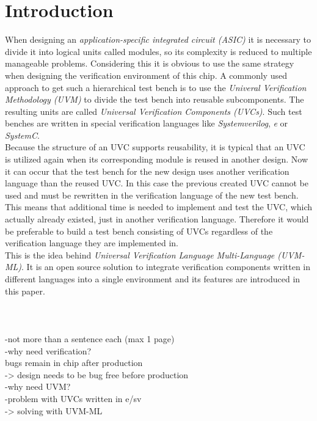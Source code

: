 \section{Introduction}\label{introduction}
When designing an \emph{application-specific integrated circuit (ASIC)} it is
necessary to divide it into logical units called modules, so its complexity is
reduced to multiple manageable problems. Considering this it is obvious to use the same
strategy when designing the verification environment of this chip. A commonly
used approach to get such a hierarchical test bench is to use the \emph{Univeral
Verification Methodology (UVM)} to divide the test bench into reusable
subcomponents. The resulting units are called \emph{Universal Verification
Components (UVCs)}. Such test benches are written in special verification
languages like \emph{Systemverilog}, \emph{e} or \emph{SystemC}.\\
Because the structure of an UVC supports reusability, it is typical that an UVC
is utilized again when its corresponding module is reused in another design. Now
it can occur that the test bench for the new design uses another verification
language than the reused UVC. In this case the previous created UVC cannot be
used and must be rewritten in the verification language of the new test bench.
This means that additional time is needed to implement and test the UVC, which
actually already existed, just in another verification language. Therefore it
would be preferable to build a test bench consisting of UVCs regardless of the
verification language they are implemented in.\\
This is the idea behind  \emph{Universal Verification Language
Multi-Language (UVM-ML)}. It is an open source solution to integrate
verification components written in different languages into a single
environment and its features are introduced in this paper.\\
\\
\\
\\
-not more than a sentence each (max 1 page)
\\
-why need verification?\\
bugs remain in chip after production\\
-> design needs to be bug free before production
\\
-why need UVM?\\
-problem with UVCs written in e/sv\\
-> solving with UVM-ML




